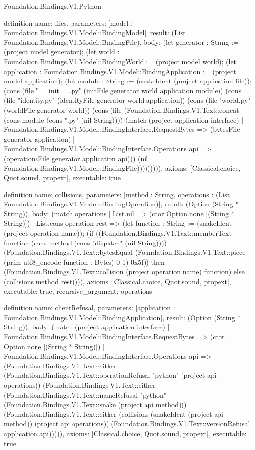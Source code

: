 \begin{lexlean}{Foundation.Bindings.V1.Python}
\begin{semanticmodule}
definition{
  name: files,
  parameters: [model : Foundation.Bindings.V1.Model::BindingModel],
  result: (List Foundation.Bindings.V1.Model::BindingFile),
  body: (let generator : String := (project model generator); (let world : Foundation.Bindings.V1.Model::BindingWorld := (project model world); (let application : Foundation.Bindings.V1.Model::BindingApplication := (project model application); (let module : String := (snakeIdent (project application file)); (cons (file "__init__.py" (initFile generator world application module)) (cons (file "identity.py" (identityFile generator world application)) (cons (file "world.py" (worldFile generator world)) (cons (file (Foundation.Bindings.V1.Text::concat (cons module (cons ".py" (nil String)))) (match (project application interface)
    | Foundation.Bindings.V1.Model::BindingInterface.RequestBytes => (bytesFile generator application)
    | Foundation.Bindings.V1.Model::BindingInterface.Operations api => (operationsFile generator application api))) (nil Foundation.Bindings.V1.Model::BindingFile))))))))),
  axioms: [Classical.choice, Quot.sound, propext],
  executable: true
}

definition{
  name: collisions,
  parameters: [method : String, operations : (List Foundation.Bindings.V1.Model::BindingOperation)],
  result: (Option (String * String)),
  body: (match operations
    | List.nil => (ctor Option.none [(String * String)])
    | List.cons operation rest => (let function : String := (snakeIdent (project operation name)); (if ((Foundation.Bindings.V1.Text::memberText function (cons method (cons "dispatch" (nil String)))) || (Foundation.Bindings.V1.Text::bytesEqual (Foundation.Bindings.V1.Text::piece (prim utf8_encode function : Bytes) 0 1) 0x5f)) then (Foundation.Bindings.V1.Text::collision (project operation name) function) else (collisions method rest)))),
  axioms: [Classical.choice, Quot.sound, propext],
  executable: true,
  recursive_argument: operations
}

definition{
  name: clientRefusal,
  parameters: [application : Foundation.Bindings.V1.Model::BindingApplication],
  result: (Option (String * String)),
  body: (match (project application interface)
    | Foundation.Bindings.V1.Model::BindingInterface.RequestBytes => (ctor Option.none [(String * String)])
    | Foundation.Bindings.V1.Model::BindingInterface.Operations api => (Foundation.Bindings.V1.Text::either (Foundation.Bindings.V1.Text::operationRefusal "python" (project api operations)) (Foundation.Bindings.V1.Text::either (Foundation.Bindings.V1.Text::nameRefusal "python" (Foundation.Bindings.V1.Text::snake (project api method))) (Foundation.Bindings.V1.Text::either (collisions (snakeIdent (project api method)) (project api operations)) (Foundation.Bindings.V1.Text::versionRefusal application api))))),
  axioms: [Classical.choice, Quot.sound, propext],
  executable: true
}


\end{semanticmodule}
\end{lexlean}
